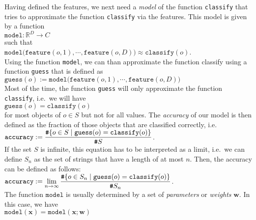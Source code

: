 Having defined the features, we next need a \emph{model} of the function \texttt{classify} that tries to approximate the
function \texttt{classify} via the features.  This model is given by a function
\\[0.2cm]
\hspace*{1.3cm}
$\texttt{model}: \mathbb{R}^D \rightarrow C$
\\[0.2cm]
such that
\\[0.2cm]
\hspace*{1.3cm}
$\mathtt{model}\bigl(\mathtt{feature}(o,1), \cdots, \mathtt{feature}(o,D)\bigr) \approx \mathtt{classify}(o)$.
\\[0.2cm]
Using the function \texttt{model}, we can than approximate the function classify using a function \texttt{guess} that is
defined as
\\[0.2cm]
\hspace*{1.3cm}
$\mathtt{guess}(o) := \mathtt{model}\bigl(\mathtt{feature}(o,1), \cdots, \mathtt{feature}(o,D)\bigr)$
\\[0.2cm]
Most of the time, the function \texttt{guess} will only approximate the function \texttt{classify}, i.e.~we will have
\\[0.2cm]
\hspace*{1.3cm}
$\mathtt{guess}(o) = \mathtt{classify}(o)$
\\[0.2cm]
for most objects of $o \in S$ but not for all values.  The \emph{accuracy} of our model is then defined as the fraction
of those objects that are classified correctly, i.e.~
\\[0.2cm]
\hspace*{1.3cm}
$\displaystyle \mathtt{accuracy} := \frac{\texttt{\#} \{ o \in S \mid \mathtt{guess}(o) = \mathtt{classify}(o)\}}{\texttt{\#} S}$.
\\[0.2cm]
If the set $S$ is infinite, this equation has to be interpreted as a limit, i.e.~we can define
$S_n$ as the set of strings that have a length of at most $n$.  Then, the accuracy can be defined as follows:
\\[0.2cm]
\hspace*{1.3cm}
$\displaystyle \mathtt{accuracy} := \lim\limits_{n\rightarrow\infty}\frac{\texttt{\#} \{ o \in S_n \mid \mathtt{guess}(o) = \mathtt{classify}(o)\}}{\texttt{\#} S_n}$.
\\[0.2cm]
The function $\mathtt{model}$ is usually determined by a set of \emph{parameters} or \emph{weights} $\mathbf{w}$. In
this case, we have
\\[0.2cm]
\hspace*{1.3cm}
$\texttt{model}(\mathbf{x}) = \mathtt{model}(\mathbf{x};\mathbf{w})$
